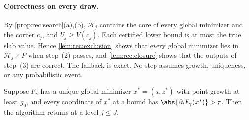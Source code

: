 \paragraph{Correctness on every draw.}
By \cref{prop:rec:search}(a),(b), $\mathcal H_j$ contains the core of every
global minimizer and the corner $c_j$, and $U_j\ge V(c_j)$. Each certified
lower bound is at most the true slab value. Hence \cref{lem:rec:exclusion}
shows that every global minimizer lies in $\mathcal H_j\times P$ when step~(2)
passes, and \cref{lem:rec:closure} shows that the outputs of step~(3) are
correct. The fallback is exact. No step assumes growth, uniqueness, or any
probabilistic event.

\begin{lemma}[Stopping]\label{lem:app:rec:stopping}
Suppose $F_\gamma$ has a unique global minimizer $x^*=(a,z^*)$ with point
growth at least $g_0$, and every coordinate of $x^*$ at a bound has
$\abs{\partial_iF_\gamma(x^*)}>\tau$. Then the algorithm returns at a level
$j\le J$.
\end{lemma}

